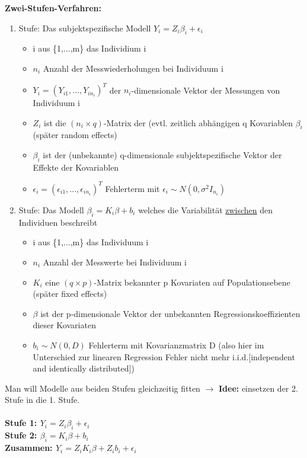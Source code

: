 \newpage
\textbf{Zwei-Stufen-Verfahren:}
\begin{enumerate}
	\item Stufe: Das subjektspezifische Modell $Y_i=Z_i\beta_i +  \epsilon_i$
	\begin{itemize}
		\item i aus \{1,...,m\} das Individium i
		\item $n_i$ Anzahl der Messwiederholungen bei Individuum i
		\item $Y_i=(Y_{i1}, ..., Y_{in_i})^T$ der $n_i$-dimensionale Vektor der Messungen von Individuum i
		\item $Z_i$ ist die $(n_i \times q)$-Matrix der (evtl. zeitlich abhängigen q Kovariablen $\beta_i$ (später random effects)
		\item $\beta_i$ ist der (unbekannte) q-dimensionale subjektspezifische Vektor der Effekte der Kovariablen
		\item $\epsilon_i=(\epsilon_{i1}, ..., \epsilon_{in_i})^T$ Fehlerterm mit $\epsilon_i \sim N(0, \sigma^2I_{n_i})$
	\end{itemize}
	\item Stufe: Das Modell $\beta_i=K_i\beta + b_i$ welches die Variabilität \underline{zwischen} den Individuen beschreibt
	\begin{itemize}
		\item i aus \{1,...,m\} das Individuum i
		\item $n_i$ Anzahl der Messwerte bei Individuum i
		\item $K_i$ eine $(q \times p)$-Matrix bekannter p Kovariaten auf
Populationsebene (später fixed effects)
		\item $\beta$ ist der p-dimensionale Vektor der unbekannten
Regressionskoeffizienten dieser Kovariaten
		\item $b_i \sim N(0,D)$ Fehlerterm mit Kovarianzmatrix D (also hier im Unterschied zur linearen Regression Fehler nicht mehr i.i.d.[independent and identically distributed])
	\end{itemize}
\end{enumerate}

Man will Modelle aus beiden Stufen gleichzeitig fitten $\rightarrow$ \textbf{Idee:} einsetzen der 2. Stufe in die 1. Stufe.
\\\\
\textbf{
Stufe 1: $Y_i=Z_i\beta_i + \epsilon_i$\\
Stufe 2: $\beta_i=K_i\beta + b_i$\\
Zusammen: $Y_i=Z_iK_i\beta + Z_ib_i + \epsilon_i$
}

